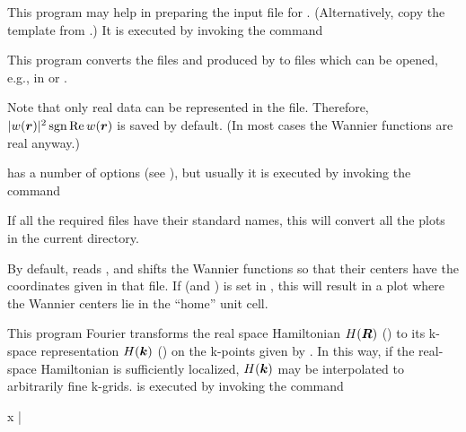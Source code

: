 
This program may help in preparing the input file for \wplot.
(Alternatively, copy the template from
.)  It is executed by invoking the
command
%
\begin{usage}
  \writeinwplot \case
\end{usage}



This program converts the files  and
 produced by \wplot to files
 which can be opened, e.g., in
\xcrys \cite{xcrys} or \vesta \cite{vesta}.

Note that only real data can be represented in the  file.
Therefore, $|w(\boldsymbol r)|^2 \operatorname{sgn} \mathop{\operatorname{Re}} w(\boldsymbol r)$ is saved by default.  (In
most cases the Wannier functions are real anyway.)

 has a number of options (see ),
but usually it is executed by invoking the command
%
\begin{usage}
  \wplottoxsf [-up|-dn]
\end{usage}
%
If all the required files have their standard names, this will convert
all the plots in the current directory.

By default,  reads , and
shifts the Wannier functions so that their centers have the
coordinates given in that file.  If  (and
) is set in , this will result in a
plot where the Wannier centers lie in the ``home'' unit cell.



This program Fourier transforms the \wannier real space Hamiltonian
$H(\boldsymbol R)$ () to its k-space representation $H(\boldsymbol
k)$ () on the k-points given by
.  In this way, if the real-space Hamiltonian is
sufficiently localized, $H(\boldsymbol k)$ may be interpolated to arbitrarily
fine k-grids.   is executed by invoking the command
%
\begin{usage}
  x \convham [-band]
  | \\
  \convham {}
\end{usage}


